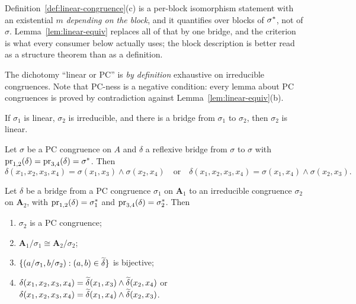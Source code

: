 \begin{hazard}\label{haz:linear-def}
Definition~\ref{def:linear-congruence}(c) is a per-block isomorphism statement
with an existential $m$ \emph{depending on the block}, and it quantifies over
blocks of $\sigma^{*}$, not of $\sigma$. Lemma~\ref{lem:linear-equiv}
replaces all of that by one bridge, and the criterion is what every consumer
below actually uses; the block description is better read as a structure
theorem than as a definition.

The dichotomy ``linear or PC'' is \emph{by definition} exhaustive on
irreducible congruences. Note that PC-ness is a negative condition: every lemma
about PC congruences is proved by contradiction against
Lemma~\ref{lem:linear-equiv}(b).
\end{hazard}

\begin{lemma}\label{lem:no-cross-bridge}
If $\sigma_{1}$ is linear, $\sigma_{2}$ is irreducible, and there is a bridge
from $\sigma_{1}$ to $\sigma_{2}$, then $\sigma_{2}$ is linear.
\end{lemma}

\begin{lemma}\label{lem:pc-bridges-trivial}
Let $\sigma$ be a PC congruence on $A$ and $\delta$ a reflexive bridge from
$\sigma$ to $\sigma$ with $\operatorname*{pr}_{1,2}(\delta)=\operatorname*{pr}_{3,4}(\delta)=
\sigma^{*}$. Then
\[
  \delta(x_{1},x_{2},x_{3},x_{4})=\sigma(x_{1},x_{3})\wedge\sigma(x_{2},x_{4})
  \quad\text{or}\quad
  \delta(x_{1},x_{2},x_{3},x_{4})=\sigma(x_{1},x_{4})\wedge\sigma(x_{2},x_{3}).
\]
\end{lemma}

\begin{lemma}\label{lem:bridge-to-pc}
Let $\delta$ be a bridge from a PC congruence $\sigma_{1}$ on $\mathbf A_{1}$
to an irreducible congruence $\sigma_{2}$ on $\mathbf A_{2}$, with
$\operatorname*{pr}_{1,2}(\delta)=\sigma_{1}^{*}$ and
$\operatorname*{pr}_{3,4}(\delta)=\sigma_{2}^{*}$. Then
\begin{enumerate}\alphlabels\tightlist
\item $\sigma_{2}$ is a PC congruence;
\item $\mathbf A_{1}/\sigma_{1}\cong\mathbf A_{2}/\sigma_{2}$;
\item $\{(a/\sigma_{1},b/\sigma_{2}):(a,b)\in\widetilde{\delta}\}$ is bijective;
\item $\delta(x_{1},x_{2},x_{3},x_{4})=
      \widetilde{\delta}(x_{1},x_{3})\wedge\widetilde{\delta}(x_{2},x_{4})$ or
      $\delta(x_{1},x_{2},x_{3},x_{4})=
      \widetilde{\delta}(x_{1},x_{4})\wedge\widetilde{\delta}(x_{2},x_{3})$.
\end{enumerate}
\end{lemma}

